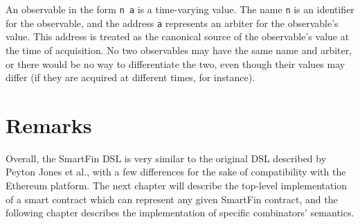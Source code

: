 An observable in the form \texttt{n a} is a time-varying value. The name \texttt{n} is an identifier for the observable, and the address \texttt{a} represents an arbiter for the observable's value. This address is treated as the canonical source of the observable's value at the time of acquisition. No two observables may have the same name and arbiter, or there would be no way to differentiate the two, even though their values may differ (if they are acquired at different times, for instance). \\


\section{Remarks}

Overall, the SmartFin DSL is very similar to the original DSL described by Peyton Jones et al.\cite{SPJ}, with a few differences for the sake of compatibility with the Ethereum platform. The next chapter will describe the top-level implementation of a smart contract which can represent any given SmartFin contract, and the following chapter describes the implementation of specific combinators' semantics.